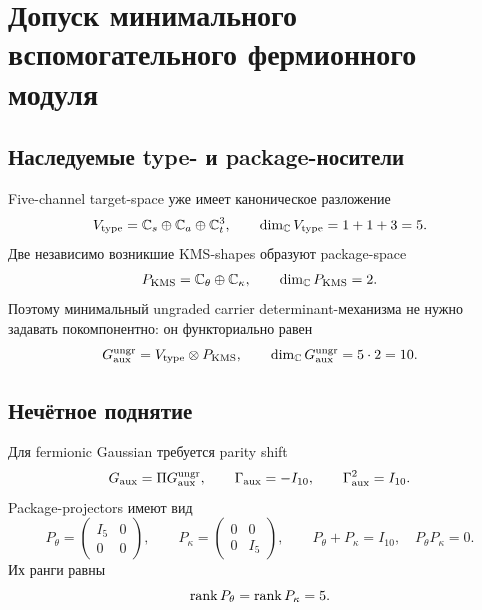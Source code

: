 \chapter{Допуск минимального вспомогательного фермионного модуля}
\label{ch:v9-kms-logdet-aux-fermion-admission}

\section{Наследуемые type- и package-носители}

Five-channel target-space уже имеет каноническое разложение
\begin{equation}
 V_{\rm type}=\mathbb C_s\oplus\mathbb C_a\oplus\mathbb C_t^3,
 \qquad \dim_{\mathbb C}V_{\rm type}=1+1+3=5.
 \label{eq:v9-kms-aux-fermion-type-carrier}
\end{equation}
Две независимо возникшие KMS-shapes образуют package-space
\begin{equation}
 P_{\rm KMS}=\mathbb C_\theta\oplus\mathbb C_\kappa,
 \qquad \dim_{\mathbb C}P_{\rm KMS}=2.
 \label{eq:v9-kms-aux-fermion-package-carrier}
\end{equation}
Поэтому минимальный ungraded carrier determinant-механизма не нужно
задавать покомпонентно: он функториально равен
\begin{equation}
 G_{\rm aux}^{\rm ungr}=V_{\rm type}\otimes P_{\rm KMS},
 \qquad \dim_{\mathbb C}G_{\rm aux}^{\rm ungr}=5\cdot2=10.
 \label{eq:v9-kms-aux-fermion-ungraded-carrier}
\end{equation}

\section{Нечётное поднятие}

Для fermionic Gaussian требуется parity shift
\begin{equation}
 G_{\rm aux}=\Pi G_{\rm aux}^{\rm ungr},
 \qquad
 \Gamma_{\rm aux}=-I_{10},
 \qquad \Gamma_{\rm aux}^2=I_{10}.
 \label{eq:v9-kms-aux-fermion-parity}
\end{equation}
Package-projectors имеют вид
\begin{equation}
 P_\theta=\begin{pmatrix}I_5&0\\0&0\end{pmatrix},
 \qquad
 P_\kappa=\begin{pmatrix}0&0\\0&I_5\end{pmatrix},
 \qquad
 P_\theta+P_\kappa=I_{10},\quad P_\theta P_\kappa=0.
 \label{eq:v9-kms-aux-fermion-package-projectors}
\end{equation}
Их ранги равны
\begin{equation}
 \operatorname{rank} P_\theta=\operatorname{rank} P_\kappa=5.
 \label{eq:v9-kms-aux-fermion-package-ranks}
\end{equation}

